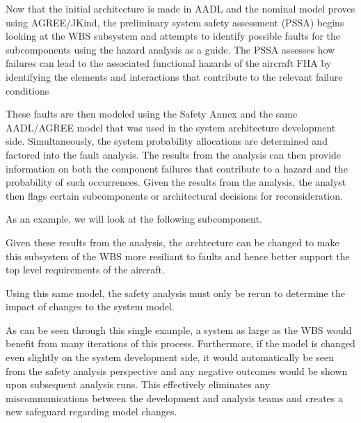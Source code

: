 Now that the initial architecture is made in AADL and the nominal model proves using AGREE/JKind, the preliminary system safety assessment (PSSA) begins looking at the WBS subsystem and attempts to identify possible faults for the subcomponents using the hazard analysis as a guide. The PSSA assesses how failures can lead to the associated functional hazards of the aircraft FHA by identifying the elements and interactions that contribute to the relevant failure conditions 

These faults are then modeled using the Safety Annex and the same AADL/AGREE model that was used in the system architecture development side. Simultaneously, the system probability allocations are determined and factored into the fault analysis. The results from the analysis can then provide information on both the component failures that contribute to a hazard and the probability of such occurrences. Given the results from the analysis, the analyst then flags certain subcomponents or architectural decisions for reconsideration. 

As an example, we will look at the following subcomponent. 

Given these results from the analysis, the archtecture can be changed to make this subsystem of the WBS more resiliant to faults and hence better support the top level requirements of the aircraft. 

Using this same model, the safety analysis must only be rerun to determine the impact of changes to the system model.  

As can be seen through this single example, a system as large as the WBS would benefit from many iterations of this process. Furthermore, if the model is changed even slightly on the system development side, it would automatically be seen from the safety analysis perspective and any negative outcomes would be shown upon subsequent analysis runs. This effectively eliminates any miscommunications between the development and analysis teams and creates a new safeguard regarding model changes. 



